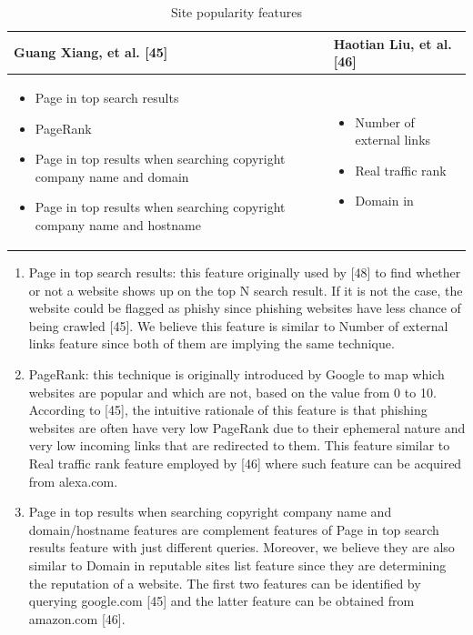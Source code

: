 \begin{table}
\begin{tabular}{>{\raggedright}p{5cm}>{\raggedright}p{3cm}}
\toprule 
\textbf{\footnotesize{}Guang Xiang, et al. {[}45{]}} & \textbf{\footnotesize{}Haotian Liu, et al. {[}46{]}}\tabularnewline
\midrule
\midrule 
\begin{itemize}
\item {\scriptsize{}Page in top search results }{\scriptsize \par}
\item {\scriptsize{}PageRank}{\scriptsize \par}
\item {\scriptsize{}Page in top results when searching copyright company
name and domain}{\scriptsize \par}
\item {\scriptsize{}Page in top results when searching copyright company
name and hostname }\end{itemize}
 & \begin{itemize}
\item {\scriptsize{}Number of external links}{\scriptsize \par}
\item {\scriptsize{}Real traffic rank}{\scriptsize \par}
\item {\scriptsize{}Domain in }\end{itemize}
\tabularnewline
\bottomrule
\end{tabular}\protect\caption{\label{tab:popular-features}Site popularity features}


\end{table}

\begin{enumerate}
\item Page in top search results: this feature originally used by {[}48{]}
to find whether or not a website shows up on the top N search result.
If it is not the case, the website could be flagged as phishy since
phishing websites have less chance of being crawled {[}45{]}. We believe
this feature is similar to Number of external links feature since
both of them are implying the same technique.
\item PageRank: this technique is originally introduced by Google to map
which websites are popular and which are not, based on the value from
0 to 10. According to {[}45{]}, the intuitive rationale of this feature
is that phishing websites are often have very low PageRank due to
their ephemeral nature and very low incoming links that are redirected
to them. This feature similar to Real traffic rank feature employed
by {[}46{]} where such feature can be acquired from alexa.com.
\item Page in top results when searching copyright company name and domain/hostname
features are complement features of Page in top search results feature
with just different queries. Moreover, we believe they are also similar
to Domain in reputable sites list feature since they are determining
the reputation of a website. The first two features can be identified
by querying google.com {[}45{]} and the latter feature can be obtained
from amazon.com {[}46{]}. 
\end{enumerate}


